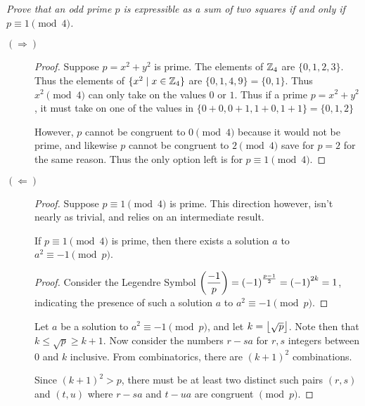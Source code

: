 \documentclass[12pt]{article}
\begin{document}
\section{} \textit{Prove that an odd prime $p$ is expressible as a sum of two squares if and only if $p \equiv 1 \pmod{4}$.}

    \begin{description}
        \item[$(\Rightarrow)$]
        \begin{proof}
            Suppose $p = x^2 + y^2$ is prime. The elements of $\mathbb{Z}_4$ are $\{0, 1, 2, 3\}$. Thus the elements of $\{x^2 \mid x \in \mathbb{Z}_4\}$ are $\{0, 1, 4, 9\} = \{0, 1\}$. Thus $x^2 \pmod{4}$ can only take on the values $0$ or $1$. Thus if a prime $p = x^2 + y^2$, it must take on one of the values in $\{0 + 0, 0 + 1, 1 + 0, 1+ 1\} = \{0, 1, 2\}$

            However, $p$ cannot be congruent to $0 \pmod{4}$ because it would not be prime, and likewise $p$ cannot be congruent to $2 \pmod{4}$ save for $p = 2$ for the same reason. Thus the only option left is for $p \equiv 1 \pmod{4}$.
        \end{proof}

        \item[$(\Leftarrow)$]
        \begin{proof}
            Suppose $p \equiv 1 \pmod{4}$ is prime. This direction however, isn't nearly as trivial, and relies on an intermediate result.

            \begin{lemma}
                If $p \equiv 1 \pmod{4}$ is prime, then there exists a solution $a$ to $a^2 \equiv -1 \pmod{p}$.
            \end{lemma}

            \begin{proof}
                Consider the Legendre Symbol $\left(\dfrac{-1}{p}\right) = {(-1)}^{\frac{p - 1}{2}} = {(-1)}^{2k} = 1$, indicating the presence of such a solution $a$ to $a^2 \equiv -1 \pmod{p}$.
            \end{proof}

            Let $a$ be a solution to $a^2 \equiv -1 \pmod{p}$, and let $k = \left\lfloor \sqrt{p} \right\rfloor$. Note then that $k \leq \sqrt{p} \geq k + 1$. Now consider the numbers $r - sa$ for $r, s$ integers between $0$ and $k$ inclusive. From combinatorics, there are ${(k + 1)}^2$ combinations.

            Since ${(k + 1)}^2 > p$, there must be at least two distinct such pairs $(r, s)$ and $(t, u)$ where $r - sa$ and $t - ua$ are congruent $\pmod{p}$.


\end{proof}
\end{description}
\end{document}
